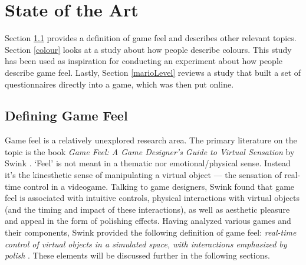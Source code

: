 \section{State of the Art} \label{stateOfTheArt}
Section \ref{define_GF} provides a definition of game feel and describes other relevant topics. Section \ref{colour} looks at a study about how people describe colours. This study has been used as inspiration for conducting an experiment about how people describe game feel. Lastly, Section \ref{marioLevel} reviews a study that built a set of questionnaires directly into a game, which was then put online.


\subsection{Defining Game Feel} \label{define_GF}
Game feel is a relatively unexplored research area. The primary literature on the topic is the book \textit{Game Feel: A Game Designer's Guide to Virtual Sensation} by Swink \cite{swink}. `Feel' is not meant in a thematic nor emotional/physical sense. Instead it's the kinesthetic sense of manipulating a virtual object --- the sensation of real-time control in a videogame. Talking to game designers, Swink found that game feel is associated with intuitive controls, physical interactions with virtual objects (and the timing and impact of these interactions), as well as aesthetic pleasure and appeal in the form of polishing effects. Having analyzed various games and their components, Swink provided the following definition of game feel: \textit{real-time control of virtual objects in a simulated space, with interactions emphasized by polish} \cite{swink}. These elements will be discussed further in the following sections.

